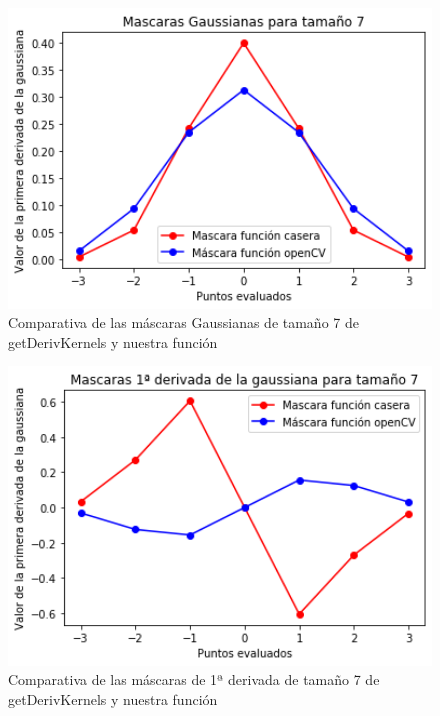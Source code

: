 \documentclass[12pt,spanish]{article}
\begin{document}
\begin{figure}[H]
	\centering
	\includegraphics[width=12cm, scale=1]{./imagenes_memoria/1_t7.png}
	\caption{Comparativa de las máscaras Gaussianas de tamaño 7 de getDerivKernels y nuestra función}
	\label{mask_t7}
\end{figure}

\begin{figure}[H]
	\centering
	\includegraphics[width=12cm]{./imagenes_memoria/1d_t7.png}
	\caption{Comparativa de las máscaras de 1ª derivada de tamaño 7 de getDerivKernels y nuestra función}
	\label{mask_1d_t7}
\end{figure}
\end{document}
